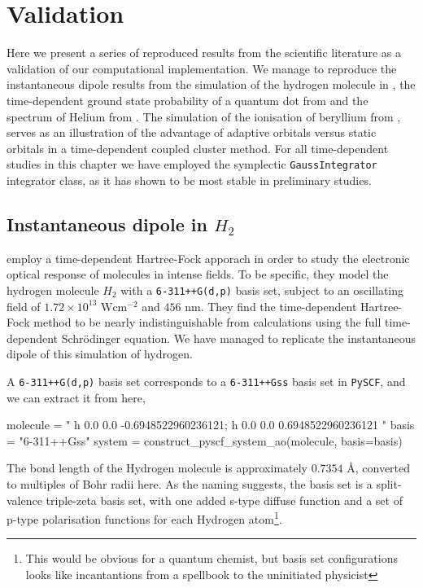 \chapter{Validation}

Here we present a series of reproduced results from the scientific literature as 
a validation of our computational implementation. We manage to reproduce the 
instantaneous dipole results from the simulation of the 
hydrogen molecule in \citeauthor{li2005time}\cite{li2005time},
the time-dependent ground state probability of a quantum dot from 
\citeauthor{Zanghellini04}\cite{Zanghellini04}
and the spectrum of Helium from
\citeauthor{pedersen2019symplectic}\cite{pedersen2019symplectic}.
The simulation of the ionisation of beryllium 
from \citeauthor{miyagi2013time}\cite{miyagi2013time},
serves as an illustration of the advantage of
adaptive orbitals versus static orbitals in a time-dependent coupled cluster method.
For all time-dependent studies in this chapter we have employed the symplectic 
\lstinline{GaussIntegrator} integrator class, as it has shown to be most stable in 
preliminary studies.


\section{Instantaneous dipole in $H_2$}

\citeauthor{li2005time}\cite{li2005time} employ a time-dependent Hartree-Fock 
apporach in order to study the electronic optical response of molecules 
in intense fields. To be specific, they model the hydrogen molecule $H_2$ 
with a \lstinline{6-311++G(d,p)} basis set, subject to an oscillating field 
of $1.72\times10^{13}\text{ W} \text{cm}^{-2}$ and $456\text{ nm}$. They find the time-dependent
Hartree-Fock method to be nearly indistinguishable from calculations using the 
full time-dependent Schrödinger equation. We have managed to replicate the 
instantaneous dipole of this simulation of hydrogen.

A \lstinline{6-311++G(d,p)} basis set corresponds to a \lstinline{6-311++Gss} 
basis set in \lstinline{PySCF}, and we can extract it from here,
\begin{python}
molecule = "
    h 0.0 0.0 -0.6948522960236121;
    h 0.0 0.0  0.6948522960236121
    "
basis = "6-311++Gss"
system = construct_pyscf_system_ao(molecule, basis=basis)
\end{python}
The bond length of the Hydrogen molecule is approximately $0.7354\text{ Å}$, converted 
to multiples of Bohr radii here. As the naming suggests, the basis set is a split-valence 
triple-zeta basis set, with one added s-type diffuse function and a set of p-type
polarisation 
functions for each Hydrogen atom\footnote{This would be obvious for a quantum chemist,
but basis set configurations looks like incantantions from a spellbook to the 
uninitiated physicist}.

